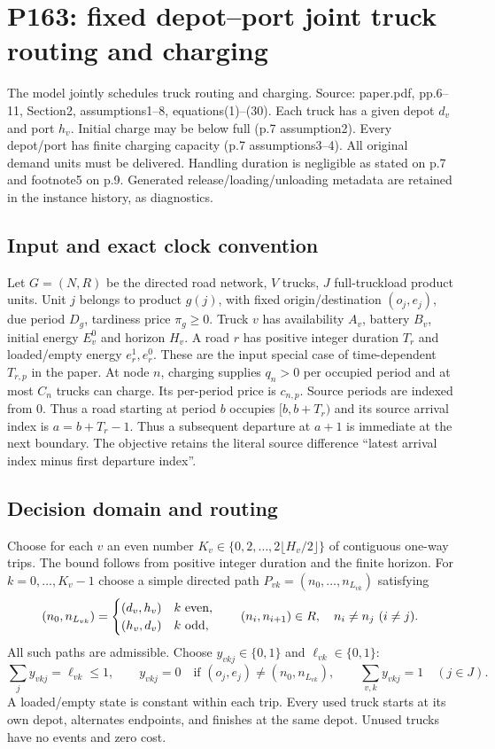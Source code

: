 \documentclass{article}
\begin{document}
\section*{P163: fixed depot--port joint truck routing and charging}
The model jointly schedules truck routing and charging. Source: paper.pdf, pp.6--11, Section2, assumptions1--8,
equations(1)--(30). Each truck has a given depot $d_v$ and port $h_v$.
Initial charge may be below full (p.7 assumption2). Every depot/port has finite
charging capacity (p.7 assumptions3--4). All original demand units must be delivered.
Handling duration is negligible as stated on p.7 and footnote5 on p.9.
Generated release/loading/unloading metadata are retained in the instance history,
as diagnostics.

\subsection*{Input and exact clock convention}
Let $G=(N,R)$ be the directed road network, $V$ trucks, $J$ full-truckload product
units. Unit $j$ belongs to product $g(j)$, with fixed origin/destination
$(o_j,e_j)$, due period $D_g$, tardiness price $\pi_g\ge0$.
Truck $v$ has availability $A_v$, battery $B_v$, initial energy $E_v^0$ and
horizon $H_v$. A road $r$ has positive integer duration $T_r$ and loaded/empty
energy $e_r^1,e_r^0$. These are the input special case of time-dependent
$T_{r,p}$ in the paper. At node $n$, charging supplies $q_n>0$ per occupied
period and at most $C_n$ trucks can charge. Its per-period price is $c_{n,p}$.
Source periods are indexed from 0. Thus a road starting at period $b$
occupies $[b,b+T_r)$ and its source arrival index is $a=b+T_r-1$.
Thus a subsequent departure at $a+1$ is immediate at the next boundary.
The objective retains the literal source difference ``latest arrival index
minus first departure index''.

\subsection*{Decision domain and routing}
Choose for each $v$ an even number $K_v\in\{0,2,\ldots,2\lfloor H_v/2\rfloor\}$
of contiguous one-way trips. The bound follows from positive integer duration
and the finite horizon.
For $k=0,\ldots,K_v-1$ choose a simple directed path
$P_{vk}=(n_0,\ldots,n_{L_{vk}})$ satisfying
\[
 (n_0,n_{L_{vk}})=
 \begin{cases}(d_v,h_v)&k\ {\rm even},\\(h_v,d_v)&k\ {\rm odd},\end{cases}
 \qquad (n_i,n_{i+1})\in R,\quad n_i\ne n_j\ (i\ne j).
\]
All such paths are admissible.
Choose $y_{vkj}\in\{0,1\}$ and $\ell_{vk}\in\{0,1\}$:
\[
 \sum_j y_{vkj}=\ell_{vk}\le1,\qquad
 y_{vkj}=0\quad\text{if }(o_j,e_j)\ne(n_0,n_{L_{vk}}),\qquad
 \sum_{v,k}y_{vkj}=1\quad(j\in J).
\]
A loaded/empty state is constant within each trip. Every used truck starts at
its own depot, alternates endpoints, and finishes at the same depot.
Unused trucks have no events and zero cost.
\end{document}

